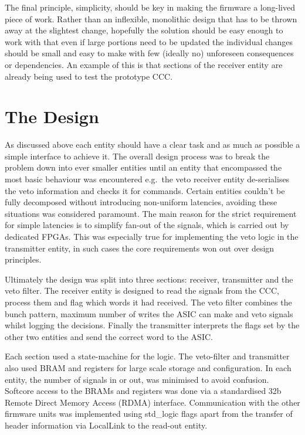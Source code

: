 The final principle, simplicity, should be key in making the firmware a long-lived piece of work. Rather than an inflexible, monolithic design that has to be thrown away at the slightest change, hopefully the solution should be easy enough to work with that even if large portions need to be updated the individual changes should be small and easy to make with few (ideally no) unforeseen consequences or dependencies. An example of this is that sections of the receiver entity are already being used to test the prototype CCC.
\section{The Design} %
\label{sec:the_design}
As discussed above each entity should have a clear task and as much as possible a simple interface to achieve it. The overall design process was to break the problem down into ever smaller entities until an entity that encompassed the most basic behaviour was encountered e.g.\ the veto receiver entity de-serialises the veto information and checks it for commands. Certain entities couldn't be fully decomposed without introducing non-uniform latencies, avoiding these situations was considered paramount. The main reason for the strict requirement for simple latencies is to simplify fan-out of the signals, which is carried out by dedicated FPGAs. This was especially true for implementing the veto logic in the transmitter entity, in such cases the core requirements won out over design principles.

Ultimately the design was split into three sections: receiver, transmitter and the veto filter. The receiver entity is designed to read the signals from the CCC, process them and flag which words it had received. The veto filter combines the bunch pattern, maximum number of writes the ASIC can make and veto signals whilst logging the decisions. Finally the transmitter interprets the flags set by the other two entities and send the correct word to the ASIC.

Each section used a state-machine for the logic. The veto-filter and transmitter also used BRAM and registers for large scale storage and configuration. In each entity, the number of signals in or out, was minimised to avoid confusion. Softcore access to the BRAMs and registers was done via a standardised 32b Remote Direct Memory Access (RDMA) interface. Communication with the other firmware units was implemented using std\_logic flags apart from the transfer of header information via LocalLink to the read-out entity.
